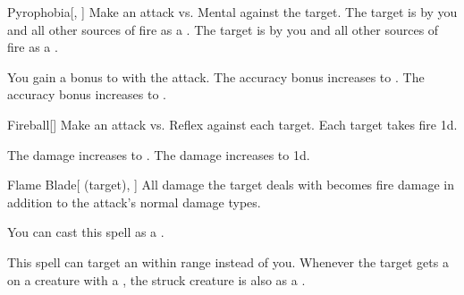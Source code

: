 \lowercase{\hypertarget{spell:Pyrophobia}{}}\label{spell:Pyrophobia}
\begin{freeability}[Rank 2]{\hypertarget{spell:Pyrophobia}{Pyrophobia}}[, ]
Make an attack vs. Mental against the target.
\hit The target is  by you and all other sources of fire as a .
\crit The target is  by you and all other sources of fire as a .

\rankline
{} You gain a  bonus to  with the attack.
 The accuracy bonus increases to .
 The accuracy bonus increases to .

\end{freeability}
\vspace{0.25em}



\lowercase{\hypertarget{spell:Fireball}{}}\label{spell:Fireball}
\begin{freeability}[Rank 3]{\hypertarget{spell:Fireball}{Fireball}}[]
Make an attack vs. Reflex against each target.
\hit Each target takes fire  \minus1d.

\rankline
{} The damage increases to .
 The damage increases to  \plus1d.

\end{freeability}
\vspace{0.25em}



\lowercase{\hypertarget{spell:Flame Blade}{}}\label{spell:Flame Blade}
\begin{attuneability}[Rank 3]{\hypertarget{spell:Flame Blade}{Flame Blade}}[ (target), ]
All damage the target deals with  becomes fire damage in addition to the attack's normal damage types.

You can cast this spell as a .

\rankline
{} This spell can target an  within \rngmed range instead of you.
 Whenever the target gets a  on a creature with a , the struck creature is also  as a .

\end{attuneability}
\vspace{0.25em}



